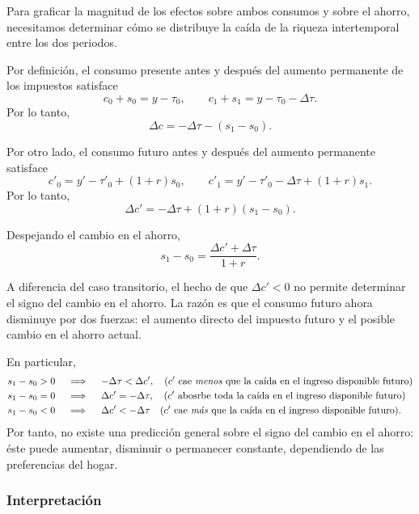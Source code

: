 \documentclass[11pt]{article}
\begin{document}
Para graficar la magnitud de los efectos sobre ambos consumos y sobre el ahorro, necesitamos determinar cómo se distribuye la caída de la riqueza intertemporal entre los dos periodos.

Por definición, el consumo presente antes y después del aumento permanente de los impuestos satisface
\[
  c_0+s_0=y-\tau_0,
  \qquad
  c_1+s_1=y-\tau_0-\Delta\tau.
\]
Por lo tanto,
\begin{equation}
  \boxed{
    \Delta c
    =
    -\Delta\tau-(s_1-s_0).
    \label{eq:DeltaCPerm}
  }
\end{equation}

Por otro lado, el consumo futuro antes y después del aumento permanente satisface
\[
  c'_0=y'-\tau'_0+(1+r)s_0,
  \qquad 
  c'_1
  =
  y'-\tau'_0-\Delta\tau+(1+r)s_1.
\]
Por lo tanto,
\begin{equation}
  \boxed{
    \Delta c'
    =
    -\Delta\tau+(1+r)(s_1-s_0).
    \label{eq:DeltaCpPerm}
  }
\end{equation}

Despejando el cambio en el ahorro,
\begin{equation}
  \boxed{
    s_1-s_0
    =
    \frac{\Delta c'+\Delta\tau}{1+r}.
    \label{eq:DeltasPerm}
  }
\end{equation}

A diferencia del caso transitorio, el hecho de que \(\Delta c'<0\) no permite determinar el signo del cambio en el ahorro. La razón es que el consumo futuro ahora disminuye por dos fuerzas: el aumento directo del impuesto futuro y el posible cambio en el ahorro actual.

En particular,
\[
\begin{aligned}
  s_1-s_0>0
  &\quad\implies\quad
  -\Delta\tau<\Delta c',  \quad \text{($c'$ cae \textit{menos} que la caída en el ingreso disponible futuro)} \\
  s_1-s_0=0
  &\quad\implies\quad
  \Delta c'=-\Delta\tau,  \quad \text{($c'$ abosrbe toda la caída en el ingreso disponible futuro)} \\
  s_1-s_0<0
  &\quad\implies\quad
  \Delta c'<-\Delta\tau  \quad \text{($c'$ cae \textit{más} que la caída en el ingreso disponible futuro)} .
\end{aligned}
\]
Por tanto, no existe una predicción general sobre el signo del cambio en el ahorro: éste puede aumentar, disminuir o permanecer constante, dependiendo de las preferencias del hogar. 


\subsubsection*{Interpretación}
\end{document}
